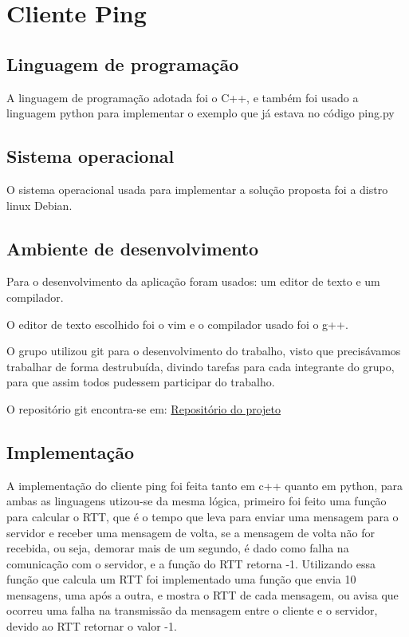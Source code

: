 \chapter[Webserver]{Cliente Ping}

\section{Linguagem de programação}

    A linguagem de programação adotada foi o C++, e também foi usado a linguagem
    python para implementar o exemplo que já estava no código ping.py

\section{Sistema operacional}

    O sistema operacional usada para implementar a solução proposta foi a distro
    linux Debian.

\section{Ambiente de desenvolvimento}

    Para o desenvolvimento da aplicação  foram usados: um editor de texto e um
    compilador.

    O editor de texto escolhido foi o vim e o compilador usado foi o g++.

    O grupo utilizou git para o desenvolvimento do trabalho, visto que
    precisávamos trabalhar de forma destrubuída, divindo tarefas para cada
    integrante do grupo, para que assim todos pudessem participar do trabalho.

    O repositório git encontra-se em: \href{https://github.com/LucianoPC/ping}{Repositório do projeto}

\section{Implementação}

    A implementação do cliente ping foi feita tanto em c++ quanto em python,
    para ambas as linguagens utizou-se da mesma lógica, primeiro foi feito uma
    função para calcular o RTT, que é o tempo que leva para enviar uma mensagem
    para o servidor e receber uma mensagem de volta, se a mensagem de volta não
    for recebida, ou seja, demorar mais de um segundo, é dado como falha na
    comunicação com o servidor, e a função do RTT retorna -1. Utilizando essa
    função que calcula um RTT foi implementado uma função que envia 10
    mensagens, uma após a outra, e mostra o RTT de cada mensagem, ou avisa que
    ocorreu uma falha na transmissão da mensagem entre o cliente e o servidor,
    devido ao RTT retornar o valor -1.

